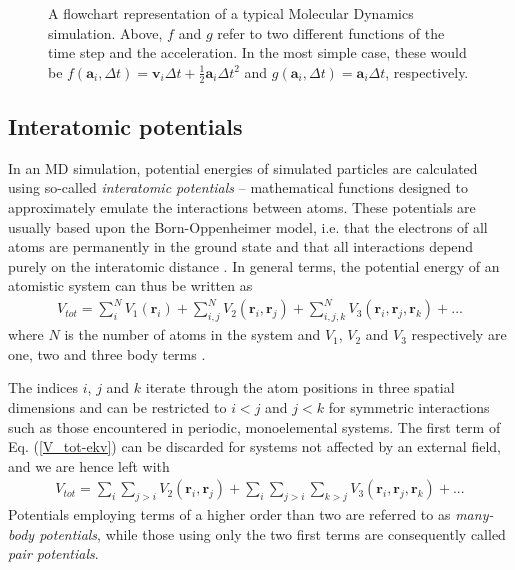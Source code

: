 \begin{figure}
\begin{center}
\endgroup
\caption{A flowchart representation of a typical Molecular Dynamics simulation. Above, $f$ and $g$ refer to two different functions of the time step and the acceleration. In the most simple case, these would be $f(\mathbf{a}_i,\Delta t) = \mathbf{v}_i\Delta t + \frac{1}{2}\mathbf{a}_i\Delta t^2$ and $g(\mathbf{a}_i,\Delta t) = \mathbf{a}_i\Delta t$, respectively.} 
\label{MD-schema}
\end{center}
\end{figure}


\subsection{Interatomic potentials}

In an MD simulation, potential energies of simulated particles are calculated using so-called \textit{interatomic potentials} -- mathematical functions designed to approximately emulate the interactions between atoms. 
These potentials are usually based upon the Born-Oppenheimer model, i.e. that the electrons of all atoms are permanently in the ground state and that all interactions depend purely on the interatomic distance \cite{born1927quantentheorie}. 
In general terms, the potential energy of an atomistic system can thus be written as
\begin{align}
V_{tot} = \sum_i^N V_1(\mathbf{r}_i) + \sum_{i,j}^N V_2(\mathbf{r}_i, \mathbf{r}_j) +  \sum_{i,j,k}^N V_3(\mathbf{r}_i, \mathbf{r}_j, \mathbf{r}_k) + ...
\label{V_tot-ekv}
\end{align}
where $N$ is the number of atoms in the system and $V_1$, $V_2$ and $V_3$ respectively are one, two and three body terms \cite{potentialsTheory}.

The indices $i$, $j$ and $k$ iterate through the atom positions in three spatial dimensions and can be restricted to $i < j$ and $j < k$ for symmetric interactions such as those encountered in periodic, monoelemental systems. 
The first term of Eq. (\ref{V_tot-ekv}) can be discarded for systems not affected by an external field, and we are hence left with
\begin{align}
V_{tot} = \sum_i \sum_{j>i} V_2(\mathbf{r}_i, \mathbf{r}_j) + \sum_i \sum_{j>i} \sum_{k > j} V_3(\mathbf{r}_i, \mathbf{r}_j, \mathbf{r}_k) + ...
\end{align}
Potentials employing terms of a higher order than two are referred to as \textit{many-body potentials}, while those using only the two first terms are consequently called \textit{pair potentials}.

